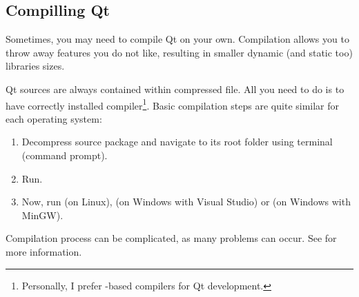 \subsection{Compilling Qt}
Sometimes, you may need to compile Qt on your own. Compilation allows you to throw away features you do not like, resulting in smaller dynamic (and static too) libraries sizes.

Qt sources are always contained within compressed file. All you need to do is to have correctly installed \cpp{} compiler\footnote{Personally, I prefer -based compilers for Qt development.}. Basic compilation steps are quite similar for each operating system:
\begin{enumerate}
\item Decompress source package and navigate to its root folder using terminal (command prompt).
\item Run.
\item Now, run (on Linux), (on Windows with Visual Studio) or (on Windows with MinGW).
\end{enumerate}

Compilation process can be complicated, as many problems can occur. See \citep{various:qtdoc} for more information.